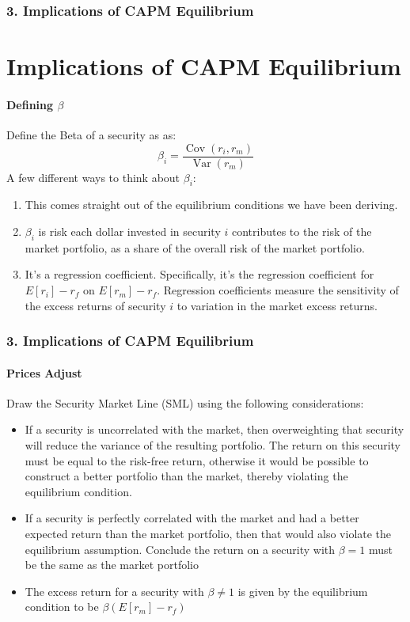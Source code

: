 \documentclass{beamer}
\begin{document}
\begin{frame}[t]
    \frametitle{3. Implications of CAPM Equilibrium}
    \section{Implications of CAPM Equilibrium}
    \framesubtitle{Defining $\beta$}

    Define the Beta of a security as as:
    $$\beta_i = \frac{\operatorname{Cov}(r_i,r_m)}{\operatorname{Var}(r_m)}$$
    A few different ways to think about $\beta_i$:
    \begin{enumerate}
        \item This comes straight out of the equilibrium conditions we have been deriving.
        \item $\beta_i$ is risk each dollar invested in security $i$ contributes to the risk of the market portfolio, as a share of the overall risk of the market portfolio.
        \item It's a regression coefficient.   Specifically, it's the regression coefficient for $E[r_i]-r_f$ on $E[r_m]-r_f$.   Regression coefficients measure the sensitivity of the 
        excess returns of security $i$ to variation in the market excess returns.
    \end{enumerate}

\end{frame}

\begin{frame}[t]
    \frametitle{3. Implications of CAPM Equilibrium}
    \framesubtitle{Prices Adjust}

    Draw the Security Market Line (SML) using the following considerations:
    \begin{itemize}
        \item If a security is uncorrelated with the market, then overweighting that 
        security will reduce the variance of the resulting portfolio.   
        The return on this security must be equal to the risk-free return, 
        otherwise it would be possible to construct a better portfolio than the market, 
        thereby violating the equilibrium condition.
        \item If a security is perfectly correlated with the market and had a better 
        expected return than the market portfolio, then that would also violate the 
        equilibrium assumption.   Conclude the return on a security with $\beta=1$ must 
        be the same as the market portfolio
        \item The excess return for a security with $\beta \neq 1$ is given 
        by the equilibrium condition to be $\beta (E[r_m]-r_f)$
    \end{itemize}
    
\end{frame}
\end{document}
